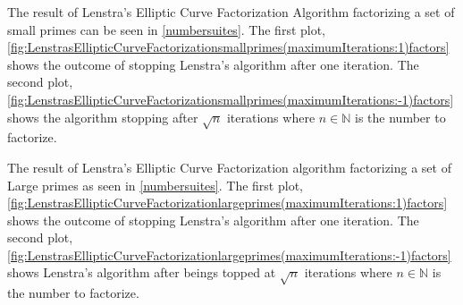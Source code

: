 The result of Lenstra's Elliptic Curve Factorization Algorithm factorizing a set of small primes can be seen in \ref{numbersuites}. The first plot, \ref{fig:LenstrasEllipticCurveFactorizationsmallprimes(maximumIterations:1)factors} shows the outcome of stopping Lenstra's algorithm after one iteration. The second plot, \ref{fig:LenstrasEllipticCurveFactorizationsmallprimes(maximumIterations:-1)factors} shows the algorithm stopping after $\sqrt{n}$ iterations where $n\in\mathbb{N}$ is the number to factorize.




The result of Lenstra's Elliptic Curve Factorization algorithm factorizing a set of Large primes as seen in \ref{numbersuites}. The first plot, \ref{fig:LenstrasEllipticCurveFactorizationlargeprimes(maximumIterations:1)factors} shows the outcome of stopping Lenstra's algorithm after one iteration. The second plot, \ref{fig:LenstrasEllipticCurveFactorizationlargeprimes(maximumIterations:-1)factors} shows Lenstra's algorithm after beings topped at $\sqrt{n}$ iterations where $n\in\mathbb{N}$ is the number to factorize.


